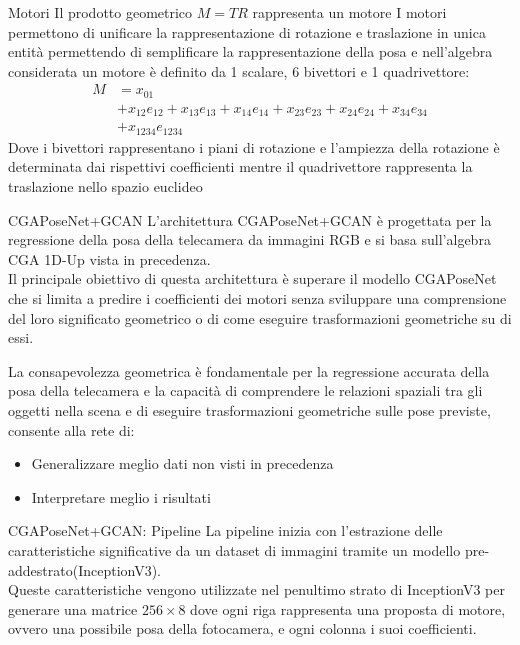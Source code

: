\begin{frame}{Motori}
   Il prodotto geometrico \(M= TR\) rappresenta un motore
   I motori permettono di unificare la rappresentazione di rotazione e traslazione in unica entità permettendo di semplificare la rappresentazione della posa e nell’algebra considerata un motore è definito da 1 scalare, 6 bivettori e 1 quadrivettore:
   \begin{align*}
      M &= x_{01} \\
          &+ x_{12}e_{12}
          + x_{13}e_{13}
          + x_{14}e_{14} 
          + x_{23}e_{23} 
          + x_{24}e_{24} 
          + x_{34}e_{34} \\
          & + x_{1234}e_{1234}
      \end{align*}
      Dove i bivettori rappresentano i piani di rotazione e l'ampiezza della rotazione è determinata dai rispettivi coefficienti mentre il quadrivettore rappresenta la traslazione nello spazio euclideo
\end{frame}

\begin{frame}{CGAPoseNet+GCAN}
   L’architettura CGAPoseNet+GCAN è progettata per la regressione della posa della telecamera da immagini RGB e si basa sull’algebra CGA 1D-Up vista in precedenza. 
   \\Il principale obiettivo di questa architettura è superare il modello CGAPoseNet che si limita a predire i coefficienti dei motori senza sviluppare  una comprensione del loro significato geometrico o di come eseguire trasformazioni geometriche su di essi.
\end{frame}

\begin{frame}
    La consapevolezza geometrica è fondamentale per la regressione accurata della posa della telecamera e la capacità di comprendere le relazioni spaziali tra gli oggetti nella scena e di eseguire trasformazioni geometriche sulle pose previste, consente alla rete di:
   \begin{itemize}
      \item Generalizzare meglio dati non visti in precedenza
      \item Interpretare meglio i risultati
   \end{itemize}
\end{frame}

\begin{frame}{CGAPoseNet+GCAN: Pipeline}
   La pipeline inizia con l’estrazione delle caratteristiche significative da un dataset di immagini tramite un modello pre-addestrato(InceptionV3).
   \\Queste caratteristiche vengono utilizzate nel penultimo strato di InceptionV3 per generare una matrice \(256\times 8\) dove ogni riga rappresenta una proposta di motore, ovvero una possibile posa della fotocamera, e ogni colonna i suoi coefficienti.
\end{frame}

